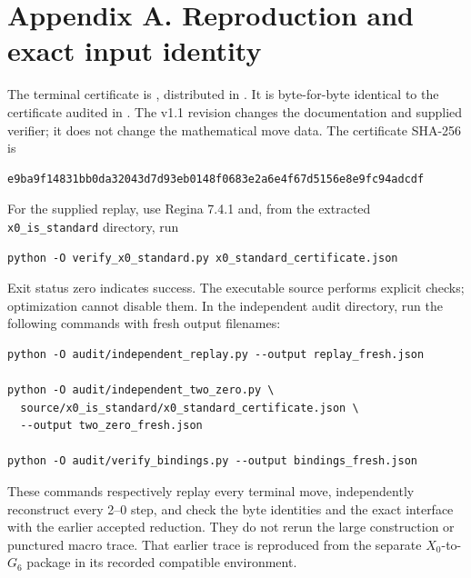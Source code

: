 \documentclass[11pt,letterpaper]{article}
\begin{document}
\section*{Appendix A. Reproduction and exact input identity}
The terminal certificate is , distributed in . It is byte-for-byte identical to the certificate audited in . The v1.1 revision changes the documentation and supplied verifier; it does not change the mathematical move data. The certificate SHA-256 is

\begin{Verbatim}
e9ba9f14831bb0da32043d7d93eb0148f0683e2a6e4f67d5156e8e9fc94adcdf
\end{Verbatim}
For the supplied replay, use Regina 7.4.1 and, from the extracted \texttt{x0\_is\_standard} directory, run

\begin{Verbatim}
python -O verify_x0_standard.py x0_standard_certificate.json
\end{Verbatim}
Exit status zero indicates success. The executable source performs explicit checks; optimization cannot disable them. In the independent audit directory, run the following commands with fresh output filenames:

\begin{Verbatim}
python -O audit/independent_replay.py --output replay_fresh.json

python -O audit/independent_two_zero.py \
  source/x0_is_standard/x0_standard_certificate.json \
  --output two_zero_fresh.json

python -O audit/verify_bindings.py --output bindings_fresh.json
\end{Verbatim}
These commands respectively replay every terminal move, independently reconstruct every 2--0 step, and check the byte identities and the exact interface with the earlier accepted reduction. They do not rerun the large construction or punctured macro trace. That earlier trace is reproduced from the separate $X_0$-to-$G_6$ package in its recorded compatible environment.
\end{document}
